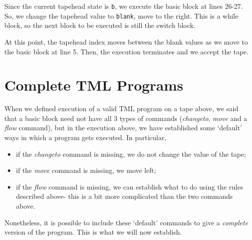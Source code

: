 \noindent Since the current tapehead state is \texttt{b}, we execute the basic block at lines 26-27. So, we change the tapehead value to \texttt{blank}, move to the right. This is a while block, so the next block to be executed is still the switch block.
\begin{figure}[H]
    \centering
\end{figure}
\noindent At this point, the tapehead index moves between the blank values as we move to the basic block at line 5. Then, the execution terminates and we accept the tape.

\section{Complete TML Programs}
When we defined execution of a valid TML program on a tape above, we said that a basic block need not have all 3 types of commands (\textit{changeto}, \textit{move} and a \textit{flow} command), but in the execution above, we have established some `default' ways in which a program gets executed. In particular,
\begin{itemize}
    \item if the \textit{changeto} command is missing, we do not change the value of the tape;
    \item if the \textit{move} command is missing, we move left;
    \item if the \textit{flow} command is missing, we can establish what to do using the rules described above- this is a bit more complicated than the two commands above.
\end{itemize}
Nonetheless, it is possible to include these `default' commands to give a \emph{complete} version of the program. This is what we will now establish. 

